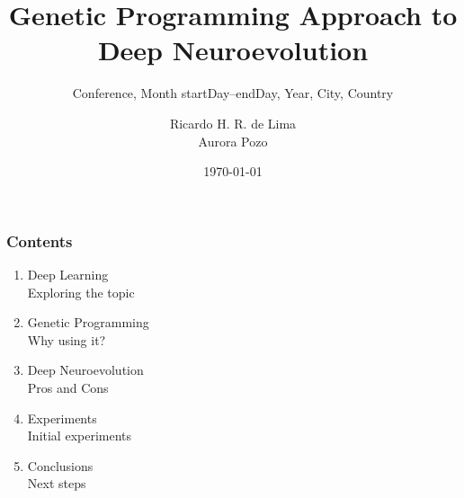 \documentclass[aspectratio=169]{beamer}
\title{Genetic Programming Approach to Deep Neuroevolution}
\author{Ricardo H. R. de Lima\\ Aurora Pozo}
\date{\today}
\subtitle{\tiny{Conference, Month startDay--endDay, Year, City, Country}}
\begin{document}
	\frame{\titlepage}

	\begin{frame}		
		\frametitle{Contents}
		\begin{enumerate}
			
			\item Deep Learning \\
				\textcolor{ExecusharesGrey}{\small\hspace{1em} Exploring the topic}
			\item Genetic Programming \\
				\textcolor{ExecusharesGrey}{\small\hspace{1em} Why using it?}
			\item Deep Neuroevolution \\
				\textcolor{ExecusharesGrey}{\small\hspace{1em} Pros and Cons}
			\item Experiments \\
				\textcolor{ExecusharesGrey}{\small\hspace{1em} Initial experiments}
			\item Conclusions \\
				\textcolor{ExecusharesGrey}{\small\hspace{1em} Next steps}
			
		\end{enumerate}
	\end{frame}

	\startprogressbar

\end{document}
